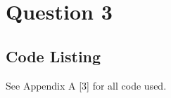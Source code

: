 \newpage
\section{Question 3}
		
	\pagebreak

	\subsection*{Code Listing}
	See Appendix A [3] for all code used.
	
	\pagebreak
